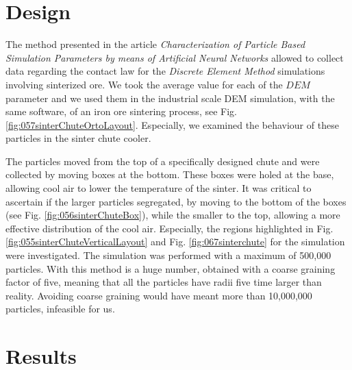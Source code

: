 

\section{Design}
\label{sec:design}



The method presented in the article \textit{Characterization of Particle Based Simulation Parameters
by means of Artificial Neural Networks} allowed to collect data
regarding the contact law
for the \textit{Discrete Element Method} simulations involving sinterized ore.
We took the average value for each of the $DEM$ parameter and we used them 
in the industrial scale DEM simulation, with the same software, 
of an iron ore sintering process, see Fig. \ref{fig:057sinterChuteOrtoLayout}.
Especially, we examined the behaviour of these particles in the sinter chute
cooler.



The particles moved from the top of a specifically designed chute and were 
collected by moving boxes at the bottom. These boxes were holed at the base, 
allowing cool air to lower the temperature of the sinter. 
It was critical to ascertain if the larger particles segregated, 
by moving to the bottom of the boxes (see Fig. \ref{fig:056sinterChuteBox}), while the smaller to the top,
allowing a more effective distribution of the cool air. 
Especially, the regions
highlighted in Fig. \ref{fig:055sinterChuteVerticalLayout} and
Fig. \ref{fig:067sinterchute} for the simulation were investigated.
The simulation was performed with a maximum of 500,000 particles.
With this method is a huge number, obtained with a coarse graining factor of
five, meaning that all the particles have radii five time larger than reality.
Avoiding coarse graining would have meant more than 10,000,000 particles,
infeasible for us.




\section{Results}
\label{sec:results}

